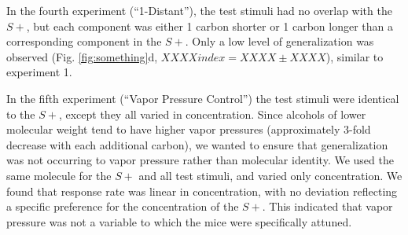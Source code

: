 In the fourth experiment (``1-Distant''), the test stimuli had no overlap with the $S+$, but each component was either 1 carbon shorter or 1 carbon longer than a corresponding component in the $S+$.  Only a low level of generalization was observed (Fig. \ref{fig:something}d, $XXXX index = XXXX \pm XXXX$), similar to experiment 1.  

In the fifth experiment (``Vapor Pressure Control'') the test stimuli were identical to the $S+$, except they all varied in concentration.  Since alcohols of lower molecular weight tend to have higher vapor pressures (approximately 3-fold decrease with each additional carbon), we wanted to ensure that generalization was not occurring to vapor pressure rather than molecular identity.  We used the same molecule for the $S+$ and all test stimuli, and varied only concentration.  We found that response rate was linear in concentration, with no deviation reflecting a specific preference for the concentration of the $S+$.  This indicated that vapor pressure was not a variable to which the mice were specifically attuned.  